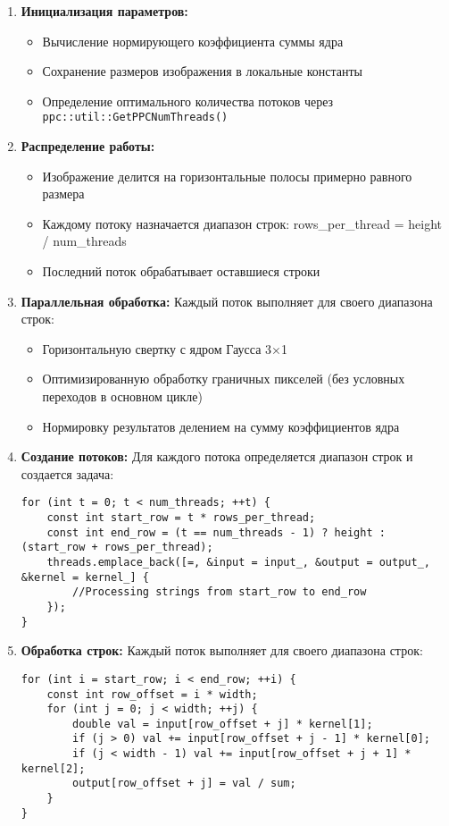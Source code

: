 \documentclass[12pt]{article}
\begin{document}
\begin{enumerate}
\item \textbf{Инициализация параметров:}
\begin{itemize}
\item Вычисление нормирующего коэффициента суммы ядра
\item Сохранение размеров изображения в локальные константы
\item Определение оптимального количества потоков через \texttt{ppc::util::GetPPCNumThreads()}
\end{itemize}

\item \textbf{Распределение работы:}
\begin{itemize}
\item Изображение делится на горизонтальные полосы примерно равного размера
\item Каждому потоку назначается диапазон строк:
rows\_per\_thread = height / num\_threads

\item Последний поток обрабатывает оставшиеся строки
\end{itemize}

\item \textbf{Параллельная обработка:}
Каждый поток выполняет для своего диапазона строк:
\begin{itemize}
\item Горизонтальную свертку с ядром Гаусса 3×1
\item Оптимизированную обработку граничных пикселей (без условных переходов в основном цикле)
\item Нормировку результатов делением на сумму коэффициентов ядра
\end{itemize}

\item \textbf{Создание потоков:}
Для каждого потока определяется диапазон строк и создается задача:
\begin{lstlisting}
for (int t = 0; t < num_threads; ++t) {
    const int start_row = t * rows_per_thread;
    const int end_row = (t == num_threads - 1) ? height : (start_row + rows_per_thread);
    threads.emplace_back([=, &input = input_, &output = output_, &kernel = kernel_] {
        //Processing strings from start_row to end_row
    });
}
\end{lstlisting}

\item \textbf{Обработка строк:}
Каждый поток выполняет для своего диапазона строк:
\begin{lstlisting}
for (int i = start_row; i < end_row; ++i) {
    const int row_offset = i * width;
    for (int j = 0; j < width; ++j) {
        double val = input[row_offset + j] * kernel[1];
        if (j > 0) val += input[row_offset + j - 1] * kernel[0];
        if (j < width - 1) val += input[row_offset + j + 1] * kernel[2];
        output[row_offset + j] = val / sum;
    }
}
\end{lstlisting}


\end{enumerate}
\end{document}
